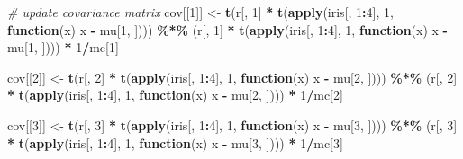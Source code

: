 \documentclass[12pt]{article}
\newenvironment{Shaded}{\begin{snugshade}}{\end{snugshade}}
\newcommand{\CommentTok}[1]{\textcolor[rgb]{0.56,0.35,0.01}{\textit{#1}}}
\newcommand{\ControlFlowTok}[1]{\textcolor[rgb]{0.13,0.29,0.53}{\textbf{#1}}}
\newcommand{\DecValTok}[1]{\textcolor[rgb]{0.00,0.00,0.81}{#1}}
\newcommand{\FunctionTok}[1]{\textcolor[rgb]{0.13,0.29,0.53}{\textbf{#1}}}
\newcommand{\NormalTok}[1]{#1}
\newcommand{\OtherTok}[1]{\textcolor[rgb]{0.56,0.35,0.01}{#1}}
\newcommand{\SpecialCharTok}[1]{\textcolor[rgb]{0.81,0.36,0.00}{\textbf{#1}}}
\begin{document}
\begin{Shaded}
\begin{Highlighting}[]
\CommentTok{\# update covariance matrix}
\NormalTok{cov[[}\DecValTok{1}\NormalTok{]] }\OtherTok{\textless{}{-}} \FunctionTok{t}\NormalTok{(r[, }\DecValTok{1}\NormalTok{] }\SpecialCharTok{*} \FunctionTok{t}\NormalTok{(}\FunctionTok{apply}\NormalTok{(iris[, }\DecValTok{1}\SpecialCharTok{:}\DecValTok{4}\NormalTok{], }\DecValTok{1}\NormalTok{,}
                               \ControlFlowTok{function}\NormalTok{(x) x }\SpecialCharTok{{-}}\NormalTok{ mu[}\DecValTok{1}\NormalTok{, ]))) }\SpecialCharTok{\%*\%} 
\NormalTok{    (r[, }\DecValTok{1}\NormalTok{] }\SpecialCharTok{*} \FunctionTok{t}\NormalTok{(}\FunctionTok{apply}\NormalTok{(iris[, }\DecValTok{1}\SpecialCharTok{:}\DecValTok{4}\NormalTok{], }\DecValTok{1}\NormalTok{,}
                      \ControlFlowTok{function}\NormalTok{(x) x }\SpecialCharTok{{-}}\NormalTok{ mu[}\DecValTok{1}\NormalTok{, ]))) }\SpecialCharTok{*} \DecValTok{1}\SpecialCharTok{/}\NormalTok{mc[}\DecValTok{1}\NormalTok{]}

\NormalTok{cov[[}\DecValTok{2}\NormalTok{]] }\OtherTok{\textless{}{-}} \FunctionTok{t}\NormalTok{(r[, }\DecValTok{2}\NormalTok{] }\SpecialCharTok{*} \FunctionTok{t}\NormalTok{(}\FunctionTok{apply}\NormalTok{(iris[, }\DecValTok{1}\SpecialCharTok{:}\DecValTok{4}\NormalTok{], }\DecValTok{1}\NormalTok{,}
                               \ControlFlowTok{function}\NormalTok{(x) x }\SpecialCharTok{{-}}\NormalTok{ mu[}\DecValTok{2}\NormalTok{, ]))) }\SpecialCharTok{\%*\%} 
\NormalTok{    (r[, }\DecValTok{2}\NormalTok{] }\SpecialCharTok{*} \FunctionTok{t}\NormalTok{(}\FunctionTok{apply}\NormalTok{(iris[, }\DecValTok{1}\SpecialCharTok{:}\DecValTok{4}\NormalTok{], }\DecValTok{1}\NormalTok{,}
                      \ControlFlowTok{function}\NormalTok{(x) x }\SpecialCharTok{{-}}\NormalTok{ mu[}\DecValTok{2}\NormalTok{, ]))) }\SpecialCharTok{*} \DecValTok{1}\SpecialCharTok{/}\NormalTok{mc[}\DecValTok{2}\NormalTok{]}

\NormalTok{cov[[}\DecValTok{3}\NormalTok{]] }\OtherTok{\textless{}{-}} \FunctionTok{t}\NormalTok{(r[, }\DecValTok{3}\NormalTok{] }\SpecialCharTok{*} \FunctionTok{t}\NormalTok{(}\FunctionTok{apply}\NormalTok{(iris[, }\DecValTok{1}\SpecialCharTok{:}\DecValTok{4}\NormalTok{], }\DecValTok{1}\NormalTok{,}
                               \ControlFlowTok{function}\NormalTok{(x) x }\SpecialCharTok{{-}}\NormalTok{ mu[}\DecValTok{3}\NormalTok{, ]))) }\SpecialCharTok{\%*\%} 
\NormalTok{    (r[, }\DecValTok{3}\NormalTok{] }\SpecialCharTok{*} \FunctionTok{t}\NormalTok{(}\FunctionTok{apply}\NormalTok{(iris[, }\DecValTok{1}\SpecialCharTok{:}\DecValTok{4}\NormalTok{], }\DecValTok{1}\NormalTok{,}
                      \ControlFlowTok{function}\NormalTok{(x) x }\SpecialCharTok{{-}}\NormalTok{ mu[}\DecValTok{3}\NormalTok{, ]))) }\SpecialCharTok{*} \DecValTok{1}\SpecialCharTok{/}\NormalTok{mc[}\DecValTok{3}\NormalTok{]}


\end{Highlighting}
\end{Shaded}
\end{document}
